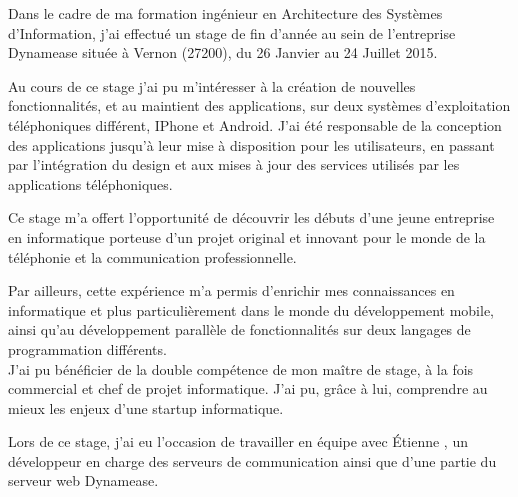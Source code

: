 Dans le cadre de ma formation ingénieur en Architecture des Systèmes d'Information, j’ai effectué un stage de fin d'année au sein de l'entreprise Dynamease située à Vernon (27200), du 26 Janvier au 24 Juillet 2015.

Au cours de ce stage j’ai pu m’intéresser à la création de nouvelles fonctionnalités, et au maintient des applications, sur deux systèmes d'exploitation téléphoniques différent, IPhone et Android. J'ai été responsable de la conception des applications jusqu'à leur mise à disposition pour les utilisateurs, en passant par l’intégration du design et aux mises à jour des services utilisés par les applications téléphoniques.

Ce stage m’a offert l’opportunité de découvrir les débuts d’une jeune entreprise en informatique porteuse d’un projet original et innovant pour le monde de la téléphonie et la communication professionnelle.

Par ailleurs, cette expérience m’a permis d’enrichir mes connaissances en informatique et plus particulièrement dans le monde du développement mobile, ainsi qu'au développement parallèle de fonctionnalités sur deux langages de programmation différents.\\


J’ai pu bénéficier de la double compétence de mon maître de stage, à la fois commercial et chef de projet informatique. J’ai pu, grâce à lui, comprendre au mieux les enjeux d’une startup informatique.

Lors de ce stage, j’ai eu l’occasion de travailler en équipe avec Étienne , un développeur en charge des serveurs de communication ainsi que d'une partie du serveur web Dynamease.